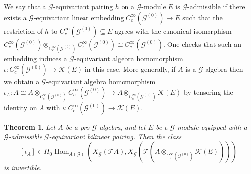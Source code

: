 \documentclass{amsart}
\newtheorem{thm}{Theorem}[section]
\newcommand{\G}{\mathcal{G}}
\newcommand{\K}{\mathcal{K}}
\newcommand{\T}{\mathcal{T}}
\newcommand{\ccinfty}{C_c^\infty}
\DeclareMathOperator{\Hom}{Hom}
\begin{document}
We say that a $ \G $-equivariant pairing $ h $ on a $ \G $-module $ E $ is $ \G $-admissible if there exists a $ \G $-equivariant linear embedding $ \ccinfty(\G^{(0)}) \rightarrow E $ such that the restriction of $ h $ to $ \ccinfty(\G^{(0)}) \subseteq E $ agrees with the canonical isomorphism $ \ccinfty(\G^{(0)}) \otimes_{\ccinfty(\G^{(0)})} \ccinfty(\G^{(0)}) \cong \ccinfty(\G^{(0)}) $. One checks that such an embedding induces a $ \G $-equivariant algebra homomorphism $ \iota: \ccinfty(\G^{(0)}) \rightarrow \K(E) $ in this case. 
More generally, if $ A $ is a $ \G $-algebra then we obtain a $ \G $-equivariant algebra homo\-morphism $ \iota_A: A \cong A \otimes_{\ccinfty(\G^{(0)})} \ccinfty(\G^{(0)}) \rightarrow A \otimes_{\ccinfty(\G^{(0)})} \K(E) $ by tensoring the identity on $ A $ with $ \iota: \ccinfty(\G^{(0)}) \rightarrow \K(E) $. 

\begin{thm} \label{StabLemma} 
Let $ A $ be a pro-$ \G $-algebra, and let $ E $ be a $ \G $-module equipped with a $ \G $-admissible $ \G $-equivariant bilinear pairing. Then the class 
$$
[\iota_A] \in H_0 \Hom_{A(\G)}(X_\G(\T A), X_\G(\T(A \otimes_{\ccinfty(\G^{(0)})} \K(E)))) 
$$
is invertible.
\end{thm}
\end{document}
